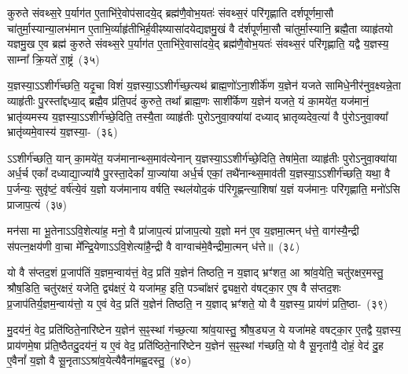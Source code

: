 कुरुते संवथ्स॒रे प॒र्याग॑त ए॒ताभि॑रे॒वोप॑सादये॒द् ब्रह्म॑णै॒वोभ॒यतः॑ संवथ्स॒रं परि॑गृह्णाति दर्\mbox{}श\-पूर्ण\-मा॒सौ चा॑तुर्मा॒स्यान्या॒लभ॑मान ए॒ताभि॒र्व्याहृ॑तीभिर्\mbox{}ह॒वीꣴष्यासा॑द\-येद्यज्ञमु॒खं वै द॑र्\mbox{}शपूर्णमा॒सौ चा॑तुर्मा॒स्यानि॒ ब्रह्मै॒ता व्याहृ॑तयो यज्ञमु॒ख ए॒व ब्रह्म॑ कुरुते संवथ्स॒रे प॒र्याग॑त ए॒ताभि॑रे॒वासा॑द\-ये॒द् ब्रह्म॑णै॒वोभ॒यतः॑ संवथ्स॒रं परि॑गृह्णाति॒ यद्वै य॒ज्ञस्य॒ साम्ना᳚ क्रि॒यते॑ रा॒ष्ट्रं~(३५)

य॒ज्ञस्या॒\-ऽऽ\-शीर्ग॑च्छति॒ यदृ॒चा विशं॑ य॒ज्ञस्या॒\-ऽऽ\-शीर्ग॑च्छ॒त्यथ॑ ब्राह्म॒णो॑\-ऽना॒शीर्के॑ण य॒ज्ञेन॑ यजते सामिधे॒नीर॑नुव॒क्ष्यन्ने॒ता व्याहृ॑तीः पु॒रस्ता᳚द्दध्या॒द् ब्रह्मै॒व प्र॑ति॒पदं॑ कुरुते॒ तथा᳚ ब्राह्म॒णः साशी᳚र्केण य॒ज्ञेन॑ यजते॒ यं का॒मये॑त॒ यज॑मानं॒ भ्रातृ॑व्यमस्य य॒ज्ञस्या॒\-ऽऽ\-शीर्ग॑च्छे॒दिति॒ तस्यै॒ता व्याहृ॑तीः पुरो\-ऽनुवा॒क्या॑यां दध्याद् भ्रातृव्यदेव॒त्या॑ वै पु॑रो\-ऽनुवा॒क्या᳚ भ्रातृ॑व्यमे॒वास्य॑ य॒ज्ञस्या॒-~(३६)

ऽ\-ऽशीर्ग॑च्छति॒ यान् का॒मये॑त॒ यज॑मानान्थ्स॒माव॑त्येनान् य॒ज्ञस्या॒\-ऽऽ\-शीर्ग॑च्छे॒दिति॒ तेषा॑मे॒ता व्याहृ॑तीः पुरो\-ऽनुवा॒क्या॑या अर्ध॒र्च एकां᳚ दध्याद्या॒ज्या॑यै पु॒रस्ता॒देकां᳚ या॒ज्या॑या अर्ध॒र्च एकां॒ तथै॑नान्थ्स॒माव॑ती य॒ज्ञस्या॒\-ऽऽ\-शीर्ग॑च्छति॒ यथा॒ वै प॒र्जन्यः॒ सुवृ॑ष्टं॒ वर्\mbox{}ष॑त्ये॒वं य॒ज्ञो यज॑मानाय वर्\mbox{}षति॒ स्थल॑योद॒कं प॑रिगृ॒ह्णन्त्या॒शिषा॑ य॒ज्ञं यज॑मानः॒ परि॑गृह्णाति॒ मनो॑\-ऽसि प्राजाप॒त्यं~(३७)

मन॑सा मा भू॒तेना\-ऽऽ\-वि॒शेत्या॑ह॒ मनो॒ वै प्रा॑जाप॒त्यं प्रा॑जाप॒त्यो य॒ज्ञो मन॑ ए॒व य॒ज्ञमा॒त्मन् ध॑त्ते॒ वाग॑स्यै॒न्द्री स॑पत्न॒क्षय॑णी वा॒चा मे᳚न्द्रि॒येणा\-ऽऽ\-वि॒शेत्या॑है॒न्द्री वै वाग्वाच॑मे॒वैन्द्रीमा॒त्मन् ध॑त्ते॥~(३८)

{\anuvakamend[{तेनै॒व ब्रह्म॑ रा॒ष्ट्रमे॒वास्य॑ य॒ज्ञस्य॑ प्राजाप॒त्यꣳ षट्त्रिꣳ॑शच्च}]}%

यो वै स॑प्तद॒शं प्र॒जा\-प॑तिं य॒ज्ञम॒न्वाय॑त्तं॒ वेद॒ प्रति॑ य॒ज्ञेन॑ तिष्ठति॒ न य॒ज्ञाद् भ्रꣳ॑शत॒ आ श्रा॑व॒येति॒ चतु॑रक्षर॒मस्तु॒ श्रौष॒डिति॒ चतु॑रक्षरं॒ यजेति॒ द्व्य॑क्षरं॒ ये यजा॑मह॒ इति॒ पञ्चा᳚क्षरं द्व्यक्ष॒रो व॑षट्का॒र ए॒ष वै स॑प्तद॒शः प्र॒जा\-प॑तिर्य॒ज्ञम॒न्वाय॑त्तो॒ य ए॒वं वेद॒ प्रति॑ य॒ज्ञेन॑ तिष्ठति॒ न य॒ज्ञाद् भ्रꣳ॑शते॒ यो वै य॒ज्ञस्य॒ प्राय॑णं प्रति॒ष्ठा-~(३९)

मु॒दय॑नं॒ वेद॒ प्रति॑ष्ठिते॒नारि॑ष्टेन य॒ज्ञेन॑ स॒ꣴ॒स्थां ग॑च्छ॒त्या श्रा॑व॒यास्तु॒ श्रौष॒ड्यज॒ ये यजा॑महे वषट्का॒र ए॒तद्वै य॒ज्ञस्य॒ प्राय॑णमे॒षा प्र॑ति॒ष्ठैतदु॒दय॑नं॒ य ए॒वं वेद॒ प्रति॑ष्ठिते॒नारि॑ष्टेन य॒ज्ञेन॑ स॒ꣴ॒स्थां ग॑च्छति॒ यो वै सू॒नृता॑यै॒ दोहं॒ वेद॑ दु॒ह ए॒वैनां᳚ य॒ज्ञो वै सू॒नृता\-ऽऽ\-श्रा॑व॒येत्यैवैना॑मह्व॒दस्तु॒~(४०)

